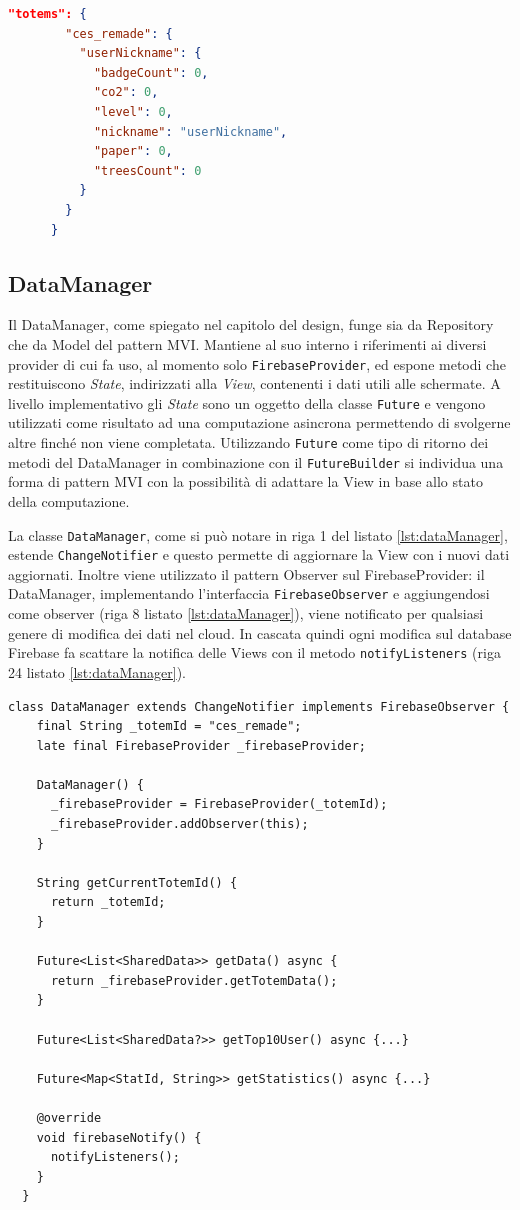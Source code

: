\begin{lstlisting}[language=json, caption={Esempio di oggetto JSON che memorizza i dati utente per ciascun Totem}, label={lst:userDataTotem}]
      "totems": {
        "ces_remade": {
          "userNickname": {
            "badgeCount": 0,
            "co2": 0,
            "level": 0,
            "nickname": "userNickname",
            "paper": 0,
            "treesCount": 0
          }
        }
      }
\end{lstlisting}

\subsection{DataManager}
Il DataManager, come spiegato nel capitolo del design, funge sia da Repository che da Model del pattern MVI. Mantiene al suo interno i riferimenti ai diversi provider di cui fa uso, al momento solo \texttt{FirebaseProvider}, ed espone metodi che restituiscono \textit{State}, indirizzati alla \textit{View}, contenenti i dati utili alle schermate. A livello implementativo gli \textit{State} sono un oggetto della classe \texttt{Future} e vengono utilizzati come risultato ad una computazione asincrona permettendo di svolgerne altre finché non viene completata. Utilizzando \texttt{Future} come tipo di ritorno dei metodi del DataManager in combinazione con il \texttt{FutureBuilder} si individua una forma di pattern MVI con la possibilità di adattare la View in base allo stato della computazione.

La classe \texttt{DataManager}, come si può notare in riga 1 del listato \ref{lst:dataManager}, estende \texttt{ChangeNotifier} e questo permette di aggiornare la View con i nuovi dati aggiornati.
Inoltre viene utilizzato il pattern Observer sul FirebaseProvider: il DataManager, implementando l'interfaccia \texttt{FirebaseObserver} e aggiungendosi come observer (riga 8 listato \ref{lst:dataManager}), viene notificato per qualsiasi genere di modifica dei dati nel cloud.
In cascata quindi ogni modifica sul database Firebase fa scattare la notifica delle Views con il metodo \texttt{notifyListeners} (riga 24 listato \ref{lst:dataManager}).

\begin{lstlisting}[style=FlutterStyle, caption={Classe DataManager}, label={lst:dataManager}]
  class DataManager extends ChangeNotifier implements FirebaseObserver {
    final String _totemId = "ces_remade";
    late final FirebaseProvider _firebaseProvider;
  
    DataManager() {
      _firebaseProvider = FirebaseProvider(_totemId);
      _firebaseProvider.addObserver(this);
    }
  
    String getCurrentTotemId() {
      return _totemId;
    }
  
    Future<List<SharedData>> getData() async {
      return _firebaseProvider.getTotemData();
    }
  
    Future<List<SharedData?>> getTop10User() async {...}
  
    Future<Map<StatId, String>> getStatistics() async {...}
  
    @override
    void firebaseNotify() {
      notifyListeners(); 
    }
  }
\end{lstlisting}

